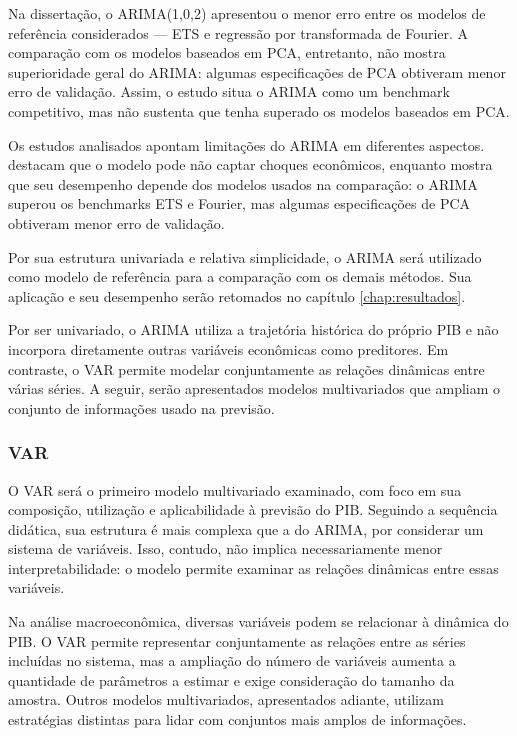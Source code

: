 Na dissertação, o ARIMA(1,0,2) apresentou o menor erro entre os modelos de referência considerados — ETS e regressão por transformada de Fourier. A comparação com os modelos baseados em PCA, entretanto, não mostra superioridade geral do ARIMA: algumas especificações de PCA obtiveram menor erro de validação. Assim, o estudo situa o ARIMA como um benchmark competitivo, mas não sustenta que tenha superado os modelos baseados em PCA.
	
Os estudos analisados apontam limitações do ARIMA em diferentes aspectos.  destacam que o modelo pode não captar choques econômicos, enquanto  mostra que seu desempenho depende dos modelos usados na comparação: o ARIMA superou os benchmarks ETS e Fourier, mas algumas especificações de PCA obtiveram menor erro de validação.

Por sua estrutura univariada e relativa simplicidade, o ARIMA será utilizado como modelo de referência para a comparação com os demais métodos. Sua aplicação e seu desempenho serão retomados no capítulo \ref{chap:resultados}.

Por ser univariado, o ARIMA utiliza a trajetória histórica do próprio PIB e não incorpora diretamente outras variáveis econômicas como preditores. Em contraste, o VAR permite modelar conjuntamente as relações dinâmicas entre várias séries. A seguir, serão apresentados modelos multivariados que ampliam o conjunto de informações usado na previsão.

\subsubsection{VAR}

O VAR será o primeiro modelo multivariado examinado, com foco em sua composição, utilização e aplicabilidade à previsão do PIB.
Seguindo a sequência didática, sua estrutura é mais complexa que a do ARIMA, por considerar um sistema de variáveis. Isso, contudo, não implica necessariamente menor interpretabilidade: o modelo permite examinar as relações dinâmicas entre essas variáveis.

Na análise macroeconômica, diversas variáveis podem se relacionar à dinâmica do PIB. O VAR permite representar conjuntamente as relações entre as séries incluídas no sistema, mas a ampliação do número de variáveis aumenta a quantidade de parâmetros a estimar e exige consideração do tamanho da amostra. Outros modelos multivariados, apresentados adiante, utilizam estratégias distintas para lidar com conjuntos mais amplos de informações.

